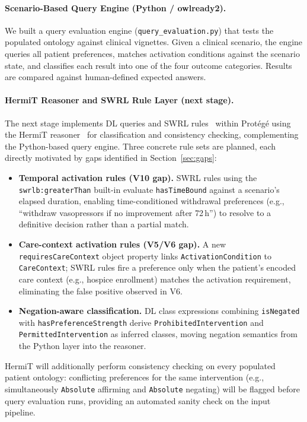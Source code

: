 \documentclass[11pt]{article}
\newcommand{\onto}[1]{\texttt{#1}}
\begin{document}
\paragraph{Scenario-Based Query Engine (Python / owlready2).}
We built a query evaluation engine (\texttt{query\_evaluation.py}) that tests the populated ontology against clinical vignettes. Given a clinical scenario, the engine queries all patient preferences, matches activation conditions against the scenario state, and classifies each result into one of the four outcome categories. Results are compared against human-defined expected answers.

\paragraph{HermiT Reasoner and SWRL Rule Layer (next stage).}
The next stage implements DL queries and SWRL rules~\cite{swrl} within Prot\'eg\'e using the HermiT reasoner~\cite{hermit} for classification and consistency checking, complementing the Python-based query engine. Three concrete rule sets are planned, each directly motivated by gaps identified in Section~\ref{sec:gaps}:
\begin{itemize}[nosep]
    \item \textbf{Temporal activation rules (V10 gap).} SWRL rules using the \texttt{swrlb:greaterThan} built-in evaluate \onto{hasTimeBound} against a scenario's elapsed duration, enabling time-conditioned withdrawal preferences (e.g., ``withdraw vasopressors if no improvement after 72\,h'') to resolve to a definitive decision rather than a partial match.
    \item \textbf{Care-context activation rules (V5/V6 gap).} A new \onto{requiresCareContext} object property links \onto{ActivationCondition} to \onto{CareContext}; SWRL rules fire a preference only when the patient's encoded care context (e.g., hospice enrollment) matches the activation requirement, eliminating the false positive observed in V6.
    \item \textbf{Negation-aware classification.} DL class expressions combining \onto{isNegated} with \onto{hasPreferenceStrength} derive \onto{ProhibitedIntervention} and \onto{PermittedIntervention} as inferred classes, moving negation semantics from the Python layer into the reasoner.
\end{itemize}
HermiT will additionally perform consistency checking on every populated patient ontology: conflicting preferences for the same intervention (e.g., simultaneously \texttt{Absolute} affirming and \texttt{Absolute} negating) will be flagged before query evaluation runs, providing an automated sanity check on the input pipeline.
\end{document}
